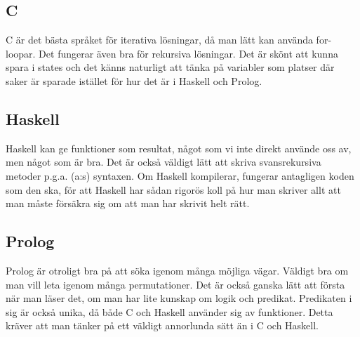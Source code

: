 \documentclass[a4paper]{article}
\begin{document}
\subsection*{C}
C är det bästa språket för iterativa lösningar, då man lätt kan använda for-loopar. Det fungerar även bra för rekursiva lösningar. Det är skönt att kunna spara i states och det känns naturligt att tänka på variabler som platser där saker är sparade istället för hur det är i Haskell och Prolog.
\subsection*{Haskell}
Haskell kan ge funktioner som resultat, något som vi inte direkt använde oss av, men något som är bra. Det är också väldigt lätt att skriva svansrekursiva metoder p.g.a. (a:s) syntaxen. Om Haskell kompilerar, fungerar antagligen koden som den ska, för att Haskell har sådan rigorös koll på hur man skriver allt att man måste försäkra sig om att man har skrivit helt rätt.
\subsection*{Prolog}
Prolog är otroligt bra på att söka igenom många möjliga vägar. Väldigt bra om man vill leta igenom många permutationer. Det är också ganska lätt att första när man läser det, om man har lite kunskap om logik och predikat. Predikaten i sig är också unika, då både C och Haskell använder sig av funktioner. Detta kräver att man tänker på ett väldigt annorlunda sätt än i C och Haskell.
\end{document}
